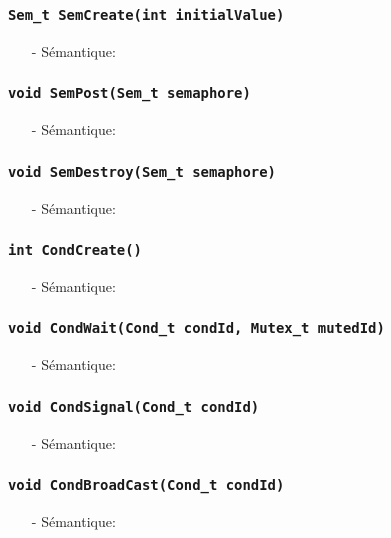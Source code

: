 \documentclass[11pt]{article}
\begin{document}
\subsubsection{\texttt{Sem\_t SemCreate(int initialValue)}}
\begin{itemize}
\item[-]Sémantique: 
\end{itemize}

\subsubsection{\texttt{void SemPost(Sem\_t semaphore)}}
\begin{itemize}
\item[-]Sémantique: 
\end{itemize}

\subsubsection{\texttt{void SemDestroy(Sem\_t semaphore)}}
\begin{itemize}
\item[-]Sémantique: 
\end{itemize}

\subsubsection{\texttt{int CondCreate()}}
\begin{itemize}
\item[-]Sémantique: 
\end{itemize}

\subsubsection{\texttt{void CondWait(Cond\_t condId, Mutex\_t mutedId)}}
\begin{itemize}
\item[-]Sémantique: 
\end{itemize}

\subsubsection{\texttt{void CondSignal(Cond\_t condId)}}
\begin{itemize}
\item[-]Sémantique: 
\end{itemize}

\subsubsection{\texttt{void CondBroadCast(Cond\_t condId)}}
\begin{itemize}
\item[-]Sémantique: 
\end{itemize}
\end{document}
